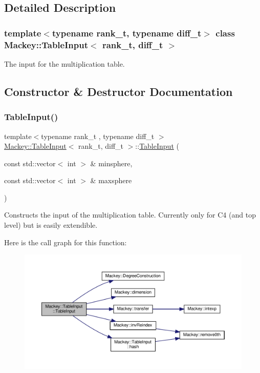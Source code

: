 \subsection{Detailed Description}
\subsubsection*{template$<$typename rank\+\_\+t, typename diff\+\_\+t$>$\newline
class Mackey\+::\+Table\+Input$<$ rank\+\_\+t, diff\+\_\+t $>$}

The input for the multiplication table. 

\subsection{Constructor \& Destructor Documentation}
\mbox{\label{classMackey_1_1TableInput_a6beec147bbfcf4e03f7a11519e478aba}} 
\subsubsection{\texorpdfstring{Table\+Input()}{TableInput()}}
{\footnotesize\ttfamily template$<$typename rank\+\_\+t , typename diff\+\_\+t $>$ \\
\hyperlink{classMackey_1_1TableInput}{Mackey\+::\+Table\+Input}$<$ rank\+\_\+t, diff\+\_\+t $>$\+::\hyperlink{classMackey_1_1TableInput}{Table\+Input} (\begin{DoxyParamCaption}\item[{const std\+::vector$<$ int $>$ \&}]{minsphere,  }\item[{const std\+::vector$<$ int $>$ \&}]{maxsphere }\end{DoxyParamCaption})\hspace{0.3cm}{\ttfamily [protected]}}



Constructs the input of the multiplication table. Currently only for C4 (and top level) but is easily extendible. 

Here is the call graph for this function\+:\nopagebreak
\begin{figure}[H]
\begin{center}
\leavevmode
\includegraphics[width=350pt]{classMackey_1_1TableInput_a6beec147bbfcf4e03f7a11519e478aba_cgraph}
\end{center}
\end{figure}


